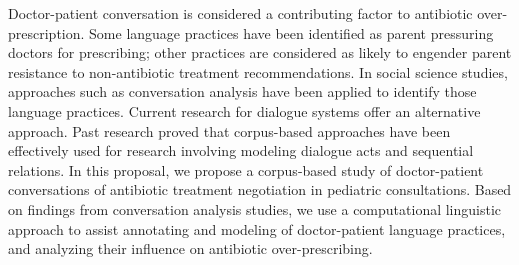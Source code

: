 Doctor-patient conversation is considered a contributing factor to antibiotic over-prescription. Some language practices have been identified as parent pressuring doctors for prescribing; other practices are considered as likely to engender parent resistance to non-antibiotic treatment recommendations. In social science studies, approaches such as conversation analysis have been applied to identify those language practices. Current research for dialogue systems offer an alternative approach. Past research proved that corpus-based approaches have been effectively used for research involving modeling dialogue acts and sequential relations. In this proposal, we propose a corpus-based study of doctor-patient conversations of antibiotic treatment negotiation in pediatric consultations. Based on findings from conversation analysis studies, we use a computational linguistic approach to assist annotating and modeling of doctor-patient language practices, and analyzing their influence on antibiotic over-prescribing.
